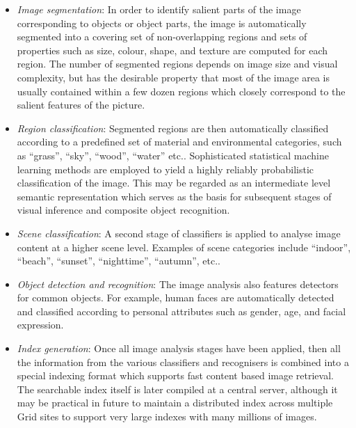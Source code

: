 \documentclass[10pt]{article}
\begin{document}
\begin{itemize}

\item {\em Image segmentation}: In order to identify salient parts of the image corresponding to objects or object parts, the image is automatically segmented into a covering set of non-overlapping regions and sets of properties such as size, colour, shape, and texture are computed for each region. The number of segmented regions depends on image size and visual complexity, but has the desirable property that most of the image area is usually contained within a few dozen regions which closely correspond to the salient features of the picture.

\item {\em Region classification}: Segmented regions are then automatically classified according to a predefined set of material and environmental categories, such as ``grass'', ``sky'', ``wood'', ``water'' etc.. Sophisticated statistical machine learning methods are employed to yield a highly reliably probabilistic classification of the image. This may be regarded as an intermediate level semantic representation which serves as the basis for subsequent stages of visual inference and composite object recognition.

\item {\em Scene classification}: A second stage of classifiers is applied to analyse image content at a higher scene level. Examples of scene categories include ``indoor'', ``beach'', ``sunset'', ``nighttime'', ``autumn'', etc..

\item {\em Object detection and recognition}: The image analysis also features detectors for common objects. For example, human faces are automatically detected and classified according to personal attributes such as gender, age, and facial expression.

\item {\em Index generation}: Once all image analysis stages have been applied, then all the information from the various classifiers and recognisers is combined into a special indexing format which supports fast content based image retrieval. The searchable index itself is later compiled at a central server, although it may be practical in future to maintain a distributed index across multiple Grid sites to support very large indexes with many millions of images.

\end{itemize}






{\small




}
\end{document}
